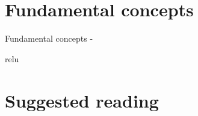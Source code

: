 \section{Fundamental concepts}
\begin{frame}[t,allowframebreaks]{Fundamental concepts - }

    \gls{relu}
\end{frame}






\section{Suggested reading}




